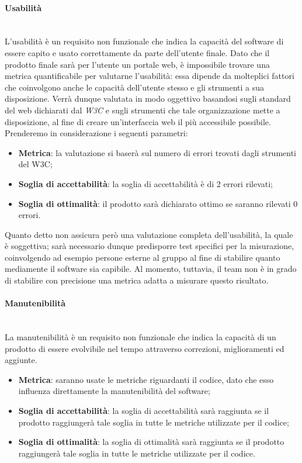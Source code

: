 \paragraph{Usabilità}
~\\L'usabilità è un requisito non funzionale che indica la capacità del software di essere capito e usato correttamente da parte dell'utente finale. Dato che il prodotto finale sarà per l'utente un portale web, è impossibile trovare una metrica quantificabile per valutarne l'usabilità: essa dipende da molteplici fattori che coinvolgono anche le capacità dell'utente stesso e gli strumenti a sua disposizione. Verrà dunque valutata in modo oggettivo basandosi sugli standard del web dichiarati dal \emph{W3C} e sugli strumenti che tale organizzazione mette a disposizione, al fine di creare un'interfaccia web il più accessibile possibile.
Prenderemo in considerazione i seguenti parametri:
\begin{itemize}
	\item \textbf{Metrica}: la valutazione si baserà sul numero di errori trovati dagli strumenti del W3C;
	\item \textbf{Soglia di accettabilità}: la soglia di accettabilità è di 2 errori rilevati;
	\item \textbf{Soglia di ottimalità}: il prodotto sarà dichiarato ottimo se saranno rilevati 0 errori.
\end{itemize}

Quanto detto non assicura però una valutazione completa dell'usabilità, la quale è soggettiva; sarà necessario dunque predisporre test specifici per la misurazione, coinvolgendo ad esempio persone esterne al gruppo al fine di stabilire quanto mediamente il software sia capibile. Al momento, tuttavia, il team non è in grado di stabilire con precisione una metrica adatta a misurare questo risultato.

\paragraph{Manutenibilità}
~\\La manutenibilità è un requisito non funzionale che indica la capacità di un prodotto di essere evolvibile nel tempo attraverso correzioni, miglioramenti ed aggiunte.

	\begin{itemize}
	\item \textbf{Metrica}: saranno usate le metriche riguardanti il codice, dato che esso influenza direttamente la manutenibilità del software;
	\item \textbf{Soglia di accettabilità}: la soglia di accettabilità sarà raggiunta se il prodotto raggiungerà tale soglia in tutte le metriche utilizzate per il codice;
	\item \textbf{Soglia di ottimalità}: la soglia di ottimalità sarà raggiunta se il prodotto raggiungerà tale soglia in tutte le metriche utilizzate per il codice.
	\end{itemize}

